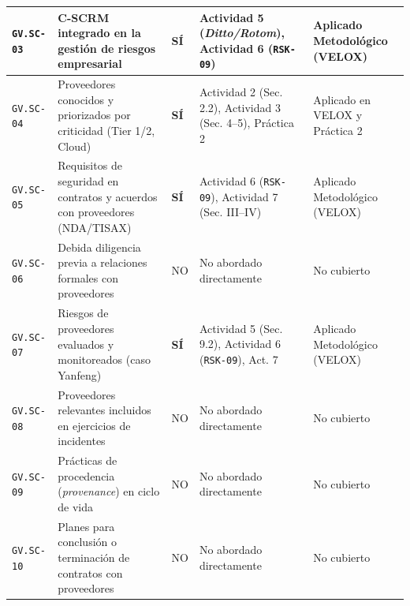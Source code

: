 \documentclass[letterpaper,11pt]{article}
\begin{document}
\begin{longtable}{|C{1.4cm}|L{5.4cm}|C{1.3cm}|L{4.3cm}|C{4.2cm}|}
\hline
\texttt{GV.SC-03} & C-SCRM integrado en la gestión de riesgos empresarial & \textbf{SÍ} & Actividad 5 (\textit{Ditto/Rotom}), Actividad 6 (\texttt{RSK-09}) & Aplicado Metodológico (VELOX) \\
\hline
\texttt{GV.SC-04} & Proveedores conocidos y priorizados por criticidad (Tier 1/2, Cloud) & \textbf{SÍ} & Actividad 2 (Sec. 2.2), Actividad 3 (Sec. 4--5), Práctica 2 & Aplicado en VELOX y Práctica 2 \\
\hline
\texttt{GV.SC-05} & Requisitos de seguridad en contratos y acuerdos con proveedores (NDA/TISAX) & \textbf{SÍ} & Actividad 6 (\texttt{RSK-09}), Actividad 7 (Sec. III--IV) & Aplicado Metodológico (VELOX) \\
\hline
\texttt{GV.SC-06} & Debida diligencia previa a relaciones formales con proveedores & NO & No abordado directamente & No cubierto \\
\hline
\texttt{GV.SC-07} & Riesgos de proveedores evaluados y monitoreados (caso Yanfeng) & \textbf{SÍ} & Actividad 5 (Sec. 9.2), Actividad 6 (\texttt{RSK-09}), Act. 7 & Aplicado Metodológico (VELOX) \\
\hline
\texttt{GV.SC-08} & Proveedores relevantes incluidos en ejercicios de incidentes & NO & No abordado directamente & No cubierto \\
\hline
\texttt{GV.SC-09} & Prácticas de procedencia (\textit{provenance}) en ciclo de vida & NO & No abordado directamente & No cubierto \\
\hline
\texttt{GV.SC-10} & Planes para conclusión o terminación de contratos con proveedores & NO & No abordado directamente & No cubierto \\
\hline


\end{longtable}
\end{document}
